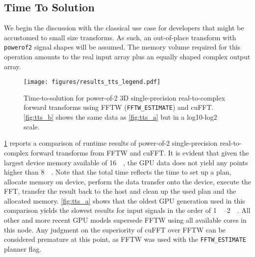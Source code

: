 \newpage
\subsection{Time To Solution}
\label{ssec:tts}

We begin the discussion with the classical use case for developers that might be accustomed to small size transforms. As such, an out-of-place transform with \texttt{powerof2} signal shapes will be assumed. The memory volume required for this operation amounts to the real input array plus an equally shaped complex output array.   

\begin{figure}[!htbp]
  \centering
  \texttt{[image: figures/results\_tts\_legend.pdf]}\vspace{-1em}
  \hfill
  \caption{Time-to-solution for power-of-2 3D single-precision real-to-complex forward transforms using FFTW (\texttt{FFTW\_ESTIMATE}) and cuFFT. \cref{fig:tts_b} shows the same data as \cref{fig:tts_a} but in a log10-log2 scale.}
  \label{fig:tts}
\end{figure}

\cref{fig:tts} reports a comparison of runtime results of power-of-2 single-precision real-to-complex forward transforms from FFTW and cuFFT. It is evident that given the largest device memory available of  \SI{16}{\gibi\byte}, the GPU data does not yield any points higher than \SI{8}{\gibi\byte}. Note that the total time reflects the time to set up a plan, allocate memory on device, perform the data transfer onto the device, execute the FFT, transfer the result back to the host and clean up the used plan and the allocated memory. \cref{fig:tts_a} shows that the oldest GPU generation used in this comparison yields the slowest results for input signals in the order of \SIrange{1}{2}{\gibi\byte}. All other and more recent GPU models supersede FFTW using all available cores in this node. Any judgment on the superiority of cuFFT over FFTW can be considered premature at this point, as FFTW was used with the \texttt{FFTW\_ESTIMATE} planner flag.

